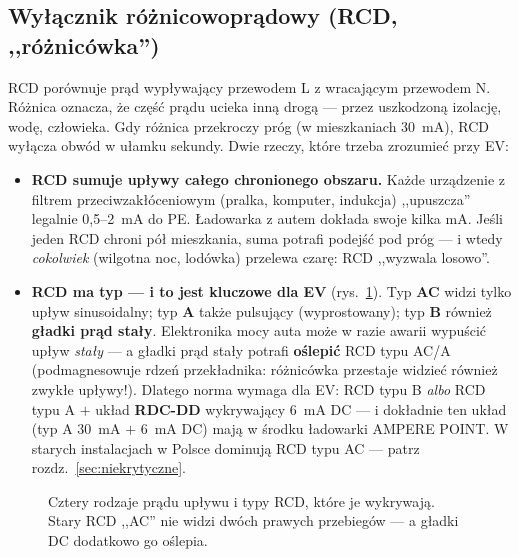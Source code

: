 \documentclass[11pt,a4paper]{article}
\begin{document}
\subsection{Wyłącznik różnicowoprądowy (RCD, ,,różnicówka'')}
RCD porównuje prąd wypływający przewodem L z wracającym przewodem N. Różnica oznacza, że część
prądu ucieka inną drogą --- przez uszkodzoną izolację, wodę, człowieka. Gdy różnica przekroczy
próg (w mieszkaniach 30~mA), RCD wyłącza obwód w ułamku sekundy. Dwie rzeczy, które trzeba
zrozumieć przy EV:
\begin{itemize}
\item \textbf{RCD sumuje upływy całego chronionego obszaru.} Każde urządzenie z filtrem
przeciwzakłóceniowym (pralka, komputer, indukcja) ,,upuszcza'' legalnie 0,5--2~mA do PE. Ładowarka
z autem dokłada swoje kilka mA. Jeśli jeden RCD chroni pół mieszkania, suma potrafi podejść pod
próg --- i wtedy \emph{cokolwiek} (wilgotna noc, lodówka) przelewa czarę: RCD ,,wyzwala losowo''.
\item \textbf{RCD ma typ --- i to jest kluczowe dla EV} (rys.~\ref{fig:rcd}). Typ \textbf{AC}
widzi tylko upływ sinusoidalny; typ \textbf{A} także pulsujący (wyprostowany); typ \textbf{B}
również \textbf{gładki prąd stały}. Elektronika mocy auta może w razie awarii wypuścić upływ
\emph{stały} --- a gładki prąd stały potrafi \textbf{oślepić} RCD typu AC/A (podmagnesowuje rdzeń
przekładnika: różnicówka przestaje widzieć również zwykłe upływy!). Dlatego norma wymaga dla EV:
RCD typu B \emph{albo} RCD typu A $+$ układ \textbf{RDC-DD} wykrywający 6~mA DC --- i dokładnie
ten układ (typ A 30~mA $+$ 6~mA DC) mają w środku ładowarki AMPERE POINT. W starych instalacjach
w Polsce dominują RCD typu AC --- patrz rozdz.~\ref{sec:niekrytyczne}.
\end{itemize}

\begin{figure}[h]
\centering
{}
\caption{Cztery rodzaje prądu upływu i typy RCD, które je wykrywają. Stary RCD ,,AC'' nie widzi
dwóch prawych przebiegów --- a gładki DC dodatkowo go oślepia.}
\label{fig:rcd}
\end{figure}
\end{document}
